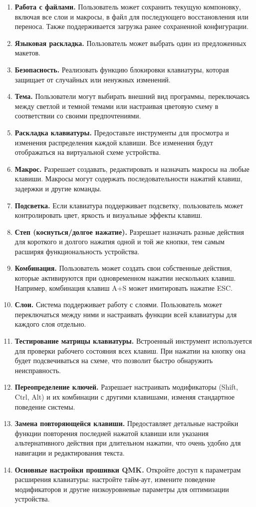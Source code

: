 \begin{enumerate}
\item \textbf{Работа с файлами.} Пользователь может сохранить текущую компоновку, включая все слои и макросы, в файл для последующего восстановления или переноса. Также поддерживается загрузка ранее сохраненной конфигурации.
\item \textbf{Языковая раскладка.} Пользователь может выбрать один из предложенных макетов.
\item \textbf{Безопасность.} Реализовать функцию блокировки клавиатуры, которая защищает от случайных или ненужных изменений.
\item \textbf{Тема.} Пользователи могут выбирать внешний вид программы, переключаясь между светлой и темной темами или настраивая цветовую схему в соответствии со своими предпочтениями.
\item \textbf{Раскладка клавиатуры.} Предоставьте инструменты для просмотра и изменения распределения каждой клавиши. Все изменения будут отображаться на виртуальной схеме устройства.
\item \textbf{Макрос.} Разрешает создавать, редактировать и назначать макросы на любые клавиши. Макросы могут содержать последовательности нажатий клавиш, задержки и другие команды.
\item \textbf{Подсветка.} Если клавиатура поддерживает подсветку, пользователь может контролировать цвет, яркость и визуальные эффекты клавиш.
\item \textbf{Степ (коснуться/долгое нажатие).} Разрешает назначать разные действия для короткого и долгого нажатия одной и той же кнопки, тем самым расширяя функциональность устройства.
\item \textbf{Комбинация.} Пользователь может создать свои собственные действия, которые активируются при одновременном нажатии нескольких клавиш. Например, комбинация клавиш A+S может имитировать нажатие ESC.
\item \textbf{Слои.} Система поддерживает работу с слоями. Пользователь может переключаться между ними и настраивать функции всей клавиатуры для каждого слоя отдельно.
\item \textbf{Тестирование матрицы клавиатуры.} Встроенный инструмент используется для проверки рабочего состояния всех клавиш. При нажатии на кнопку она будет подсвечиваться на схеме, что позволит быстро обнаружить неисправность.
\item \textbf{Переопределение ключей.} Разрешает настраивать модификаторы (Shift, Ctrl, Alt) и их комбинации с другими клавишами, изменяя стандартное поведение системы.
\item \textbf{Замена повторяющейся клавиши.} Предоставляет детальные настройки функции повторения последней нажатой клавиши или указания альтернативного действия при длительном нажатии, что очень удобно для навигации и редактирования текста.
\item \textbf{Основные настройки прошивки QMK.} Откройте доступ к параметрам расширения клавиатуры: настройте тайм-аут, измените поведение модификаторов и другие низкоуровневые параметры для оптимизации устройства.

\end{enumerate}

